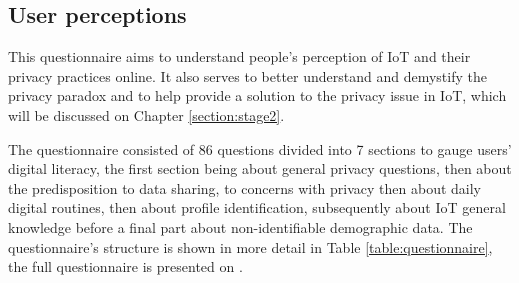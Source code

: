 \subsection{User perceptions}

This questionnaire aims to understand people's perception of IoT and their privacy
practices online. It also serves to better understand and demystify the privacy
paradox and to help provide a solution to the privacy issue in IoT, which will be
discussed on Chapter \ref{section:stage2}.

The questionnaire consisted of 86 questions divided into 7 sections to
gauge users' digital literacy, the first section being about general privacy
questions, then about the predisposition to data sharing, to concerns with
privacy then about daily digital routines, then about profile identification,
subsequently about IoT general knowledge before a final part about
non-identifiable demographic data. The questionnaire's structure is shown
in more detail in Table \ref{table:questionnaire}, the full questionnaire
is presented on .

